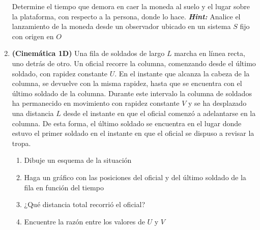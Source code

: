 \documentclass[letterpaper,11pt]{article}
\begin{document}
\begin{enumerate}
Determine el tiempo que demora en caer la moneda al suelo y el lugar sobre la plataforma, con respecto a la persona, donde lo hace.
\textbf{\textit{Hint:}} Analice el lanzamiento de la moneda desde un observador ubicado en un sistema $S$ fijo con origen en $O$


\item \textbf{(Cinemática 1D)} Una fila de soldados de largo $L$ marcha en líınea recta, uno detrás de otro. Un oficial recorre la columna, comenzando desde el último soldado, con rapidez constante $U$. En el instante que alcanza la cabeza de la columna, se devuelve con la misma rapidez, hasta que se encuentra con el último soldado de la columna. Durante este intervalo la columna de soldados ha permanecido en movimiento con rapidez constante $V$ y se ha desplazado una distancia $L$ desde el instante en que el oficial comenzó a adelantarse en la columna. De esta forma, el último soldado se encuentra en el lugar donde estuvo el primer soldado en el instante en que el oficial se dispuso a revisar la tropa.

\begin{enumerate}
    \item Dibuje un esquema de la situación
    \item Haga un gráfico con las posiciones del oficial y del último soldado de la fila en función del tiempo
    \item ¿Qué distancia total recorrió el oficial?
    \item Encuentre la razón entre los valores de $U$ y $V$
\end{enumerate}


%   

\end{enumerate}
\end{document}
